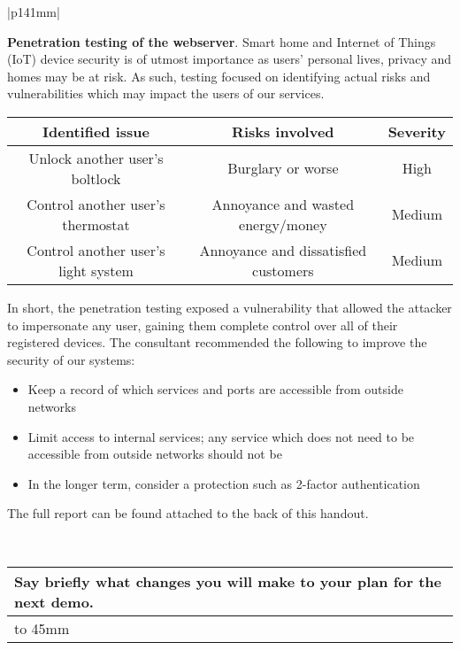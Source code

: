 \documentclass[a4paper]{article}
\newcommand{\colWidth}{141mm}
\begin{document}
\begin{center}
\begin{tabular}{|p{\colWidth}|}
{	\vspace{3mm}

	\textbf{Penetration testing of the webserver}.
	Smart home and Internet of Things (IoT) device security is of utmost importance as users' personal lives,
	privacy and homes may be at risk. As such, testing focused on identifying actual risks and vulnerabilities
	which may impact the users of our services.

	\vspace{3mm}

	\begin{tabular}{| c | c | c |} \hline
		\textbf{Identified issue} & \textbf{Risks involved} & \textbf{Severity} \\ \hline
		Unlock another user's boltlock & Burglary or worse & High \\
		Control another user's thermostat & Annoyance and wasted energy/money & Medium \\
		Control another user's light system & Annoyance and dissatisfied customers & Medium \\ \hline
	\end{tabular}

	\vspace{3mm}

	In short, the penetration testing exposed a vulnerability that allowed the attacker to impersonate
	any user, gaining them complete control over all of their registered devices. The consultant recommended
	the following to improve the security of our systems:

	\begin{itemize}
		\item Keep a record of which services and ports are accessible from outside networks
		\item Limit access to internal services; any service which does not need to be accessible from outside networks should not be
		\item In the longer term, consider a protection such as 2-factor authentication
	\end{itemize}

	The full report can be found attached to the back of this handout.
  }
  \\
  \hline
\end{tabular}
\vskip 5mm


\begin{tabular}{|p{\colWidth}|}
	\hline
	\cellcolor{blue!25}\large
	\textbf{Say briefly what changes you will make to your plan for the next demo.}
	\\ \hline
	\vtop to 45mm{
  }
  \\
  \hline
\end{tabular}

\end{center}
  
\end{document}
